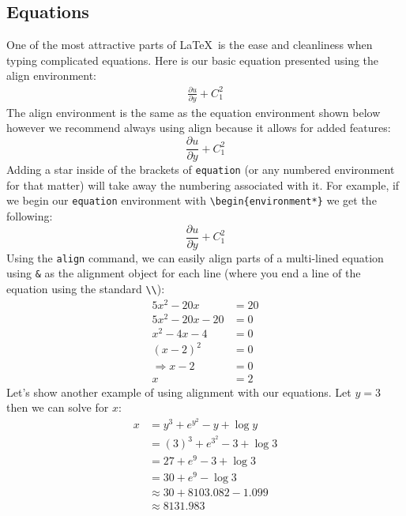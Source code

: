 \documentclass[]{article}%
\newcommand{\bs}{\textbackslash}
\newcommand{\TT}[1]{\texttt{#1}}
\theoremstyle{definition}
\begin{document}
	\subsection{Equations}
	\label{sec:equations}
	One of the most attractive parts of \LaTeX\ is the ease and cleanliness when typing complicated equations. 
	Here is our basic equation presented using the align environment:
	\begin{align}
		\label{eq:example}
		\frac{\partial u}{\partial y} + C_1^2  
	\end{align}
	The align environment is the same as the equation environment shown below however we recommend always using align because it allows for added features:
	\begin{equation}
		\frac{\partial u}{\partial y} + C_1^2  
	\end{equation}
	Adding a star inside of the brackets of \TT{equation} (or any numbered environment for that matter) will take away the numbering associated with it.
	For example, if we begin our \TT{equation} environment with \TT{\bs begin\{environment*\}} we get the following:
	\begin{equation*}
		\frac{\partial u}{\partial y} + C_1^2  
	\end{equation*}
	Using the \TT{align} command, we can easily align parts of a multi-lined equation using \TT{\&} as the alignment object for each line (where you end a line of the equation using the standard \TT{\bs \bs}):
	\begin{align*}
		5 x^2 - 20x &= 20 \\
		5 x^2 - 20x -20 &= 0 \\ 
		x^2 - 4x -4 &= 0 \\
		(x-2)^2 &= 0 \\
		\Rightarrow x - 2 &= 0 \\
		x &= 2
	\end{align*}
	Let's show another example of using alignment with our equations. Let $y=3$ then we can solve for $x$:
	\begin{align*}
		x &= y^3 + e^{y^2} - y + \log y \\
		& = (3)^3 + e^{3^2} - 3 + \log 3 \\
		& = 27 + e^9 - 3 + \log 3 \\
		& = 30 + e^9 - \log 3 \\
		& \approx 30 + 8103.082  - 1.099 \\
		& \approx \mathbf{8131.983}
	\end{align*}
\end{document}
